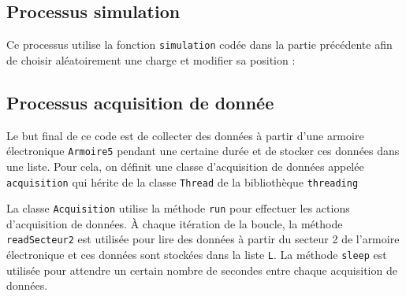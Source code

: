 \documentclass[oneside]{report}
\begin{document}
\subsection{Processus simulation}

Ce processus utilise la fonction \texttt{simulation} codée dans la partie précédente afin de choisir aléatoirement une charge et modifier sa position :





\subsection{Processus acquisition de donnée}

Le but final de ce code est de collecter des données à partir d'une armoire
électronique \texttt{Armoire5} pendant une certaine durée et de stocker ces données dans une liste. Pour cela, on définit une classe d'acquisition de données appelée \texttt{acquisition} qui hérite de la classe \texttt{Thread} de la bibliothèque \texttt{threading}

La classe \texttt{Acquisition} utilise la méthode \texttt{run} pour effectuer les actions d'acquisition de données. À chaque itération de la boucle, la méthode \texttt{readSecteur2} est utilisée pour lire des données à partir du secteur 2 de l'armoire électronique et ces données sont stockées dans la liste \texttt{L}. La méthode \texttt{sleep} est utilisée pour attendre un certain nombre de secondes entre chaque acquisition de données.





\end{document}
